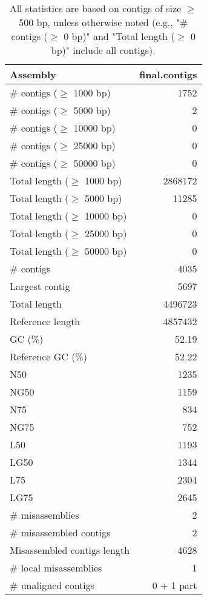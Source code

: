 \documentclass[12pt,a4paper]{article}
\begin{document}
\begin{table}[ht]
\begin{center}
\caption{All statistics are based on contigs of size $\geq$ 500 bp, unless otherwise noted (e.g., "\# contigs ($\geq$ 0 bp)" and "Total length ($\geq$ 0 bp)" include all contigs).}
\begin{tabular}{|l*{1}{|r}|}
\hline
Assembly & final.contigs \\ \hline
\# contigs ($\geq$ 1000 bp) & 1752 \\ \hline
\# contigs ($\geq$ 5000 bp) & 2 \\ \hline
\# contigs ($\geq$ 10000 bp) & 0 \\ \hline
\# contigs ($\geq$ 25000 bp) & 0 \\ \hline
\# contigs ($\geq$ 50000 bp) & 0 \\ \hline
Total length ($\geq$ 1000 bp) & 2868172 \\ \hline
Total length ($\geq$ 5000 bp) & 11285 \\ \hline
Total length ($\geq$ 10000 bp) & 0 \\ \hline
Total length ($\geq$ 25000 bp) & 0 \\ \hline
Total length ($\geq$ 50000 bp) & 0 \\ \hline
\# contigs & 4035 \\ \hline
Largest contig & 5697 \\ \hline
Total length & 4496723 \\ \hline
Reference length & 4857432 \\ \hline
GC (\%) & 52.19 \\ \hline
Reference GC (\%) & 52.22 \\ \hline
N50 & 1235 \\ \hline
NG50 & 1159 \\ \hline
N75 & 834 \\ \hline
NG75 & 752 \\ \hline
L50 & 1193 \\ \hline
LG50 & 1344 \\ \hline
L75 & 2304 \\ \hline
LG75 & 2645 \\ \hline
\# misassemblies & 2 \\ \hline
\# misassembled contigs & 2 \\ \hline
Misassembled contigs length & 4628 \\ \hline
\# local misassemblies & 1 \\ \hline
\# unaligned contigs & 0 + 1 part \\ \hline

\end{tabular}
\end{center}
\end{table}
\end{document}
